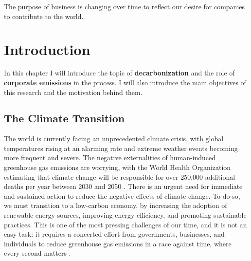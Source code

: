 \begin{savequote}[75mm]
The purpose of business is changing over time to reflect our desire for companies to contribute to the world.
\end{savequote}

\chapter{Introduction}

\begin{keytakeaway}
In this chapter I will introduce the topic of \textbf{decarbonization} and the role of \textbf{corporate emissions} in the process. I will also introduce the main objectives of this research and the motivation behind them.   
\end{keytakeaway}

\section{The Climate Transition}
The world is currently facing an unprecedented climate crisis, with global temperatures rising at an alarming rate and extreme weather events becoming more frequent and severe. The negative externalities of human-induced greenhouse gas emissions are worrying, with the World Health Organization estimating that climate change will be responsible for over 250,000 additional deaths per year between 2030 and 2050 \cite{WHO2023}. There is an urgent need for immediate and sustained action to reduce the negative effects of climate change. To do so, we must transition to a low-carbon economy, by increasing the adoption of renewable energy sources, improving energy efficiency, and promoting sustainable practices. This is one of the most pressing challenges of our time, and it is not an easy task: it requires a concerted effort from governments, businesses, and individuals to reduce greenhouse gas emissions in a race against time, where every second matters \cite{Muryani2023Strategies}.

